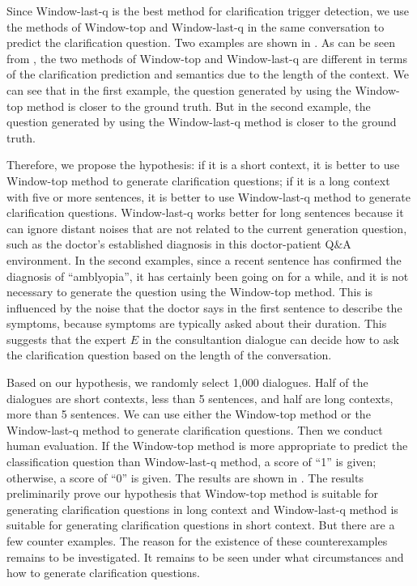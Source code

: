Since Window-last-q is the best method for clarification trigger detection, we use the methods of Window-top and Window-last-q in the same conversation to predict the clarification question. Two examples are shown in . As can be seen from , the two methods of Window-top and Window-last-q are different in terms of the clarification prediction and semantics due to the length of the context. We can see that in the first example, the question generated by using the Window-top method is closer to the ground truth. But in the second example, the question generated by using the Window-last-q method is closer to the ground truth.

Therefore, we propose the hypothesis: if it is a short context, it is better to use Window-top method to generate clarification questions; if it is a long context with five or more sentences, it is better to use Window-last-q method to generate clarification questions. 
Window-last-q works better for long sentences because it can ignore distant noises that are not related to the current generation question, such as the doctor's established diagnosis in this doctor-patient Q$\&$A environment. In the second examples, since a recent sentence has confirmed the diagnosis of ``amblyopia'', it has certainly been going on for a while, and it is not necessary to generate the question using the Window-top method. This is influenced by the noise that the doctor says in the first sentence to describe the symptoms, because symptoms are typically asked about their duration. This suggests that the expert $E$ in the consultantion dialogue can decide how to ask the clarification question based on the length of the conversation. 

Based on our hypothesis, we randomly select 1,000 dialogues. Half of the dialogues are short contexts, less than 5 sentences, and half are long contexts, more than 5 sentences. We can use either the Window-top method or the Window-last-q method to generate clarification questions. Then we conduct human evaluation. If the Window-top method is more appropriate to predict the classification question than Window-last-q method, a score of ``1'' is given; otherwise, a score of ``0'' is given. The results are shown in . The results preliminarily prove our hypothesis that Window-top method is suitable for generating clarification questions in long context and Window-last-q method is suitable for generating clarification questions in short context. But there are a few counter examples. The reason for the existence of these counterexamples remains to be investigated. It remains to be seen under what circumstances and how to generate clarification questions.

